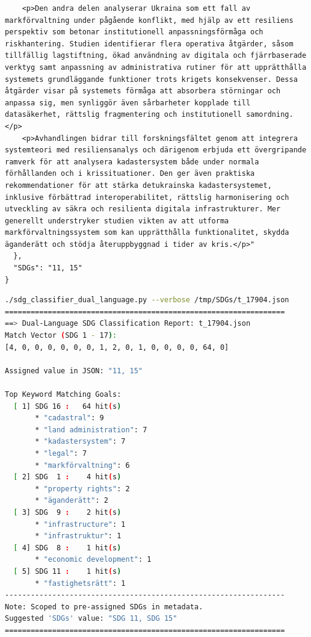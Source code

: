 \begin{casestudySection}
\begin{lstlisting}
    <p>Den andra delen analyserar Ukraina som ett fall av markförvaltning under pågående konflikt, med hjälp av ett resiliens perspektiv som betonar institutionell anpassningsförmåga och riskhantering. Studien identifierar flera operativa åtgärder, såsom tillfällig lagstiftning, ökad användning av digitala och fjärrbaserade verktyg samt anpassning av administrativa rutiner för att upprätthålla systemets grundläggande funktioner trots krigets konsekvenser. Dessa åtgärder visar på systemets förmåga att absorbera störningar och anpassa sig, men synliggör även sårbarheter kopplade till datasäkerhet, rättslig fragmentering och institutionell samordning.</p>
    <p>Avhandlingen bidrar till forskningsfältet genom att integrera systemteori med resiliensanalys och därigenom erbjuda ett övergripande ramverk för att analysera kadastersystem både under normala förhållanden och i krissituationer. Den ger även praktiska rekommendationer för att stärka detukrainska kadastersystemet, inklusive förbättrad interoperabilitet, rättslig harmonisering och utveckling av säkra och resilienta digitala infrastrukturer. Mer generellt understryker studien vikten av att utforma markförvaltningssystem som kan upprätthålla funktionalitet, skydda äganderätt och stödja återuppbyggnad i tider av kris.</p>"
  },
  "SDGs": "11, 15"
}
\end{lstlisting}

\begin{lstlisting}[language={bash}, basicstyle=\footnotesize, escapechar=|, breaklines=true,
    postbreak=\usebox{\lstbreakbox}, caption={Program's output}, label=lst:t_17904Output]
./sdg_classifier_dual_language.py --verbose /tmp/SDGs/t_17904.json
=================================================================
==> Dual-Language SDG Classification Report: t_17904.json
Match Vector (SDG 1 - 17):
[4, 0, 0, 0, 0, 0, 0, 1, 2, 0, 1, 0, 0, 0, 0, 64, 0]

Assigned value in JSON: "11, 15"

Top Keyword Matching Goals:
  [ 1] SDG 16 :   64 hit(s)
       * "cadastral": 9
       * "land administration": 7
       * "kadastersystem": 7
       * "legal": 7
       * "markförvaltning": 6
  [ 2] SDG  1 :    4 hit(s)
       * "property rights": 2
       * "äganderätt": 2
  [ 3] SDG  9 :    2 hit(s)
       * "infrastructure": 1
       * "infrastruktur": 1
  [ 4] SDG  8 :    1 hit(s)
       * "economic development": 1
  [ 5] SDG 11 :    1 hit(s)
       * "fastighetsrätt": 1
-----------------------------------------------------------------
Note: Scoped to pre-assigned SDGs in metadata.
Suggested 'SDGs' value: "SDG 11, SDG 15"
=================================================================
\end{lstlisting}


\end{casestudySection}
